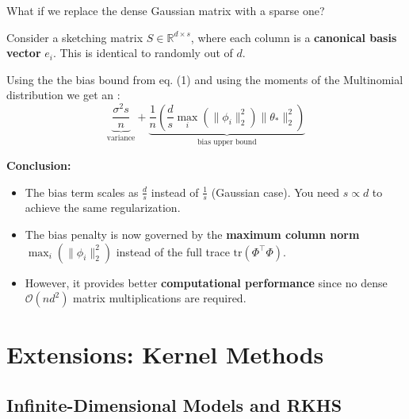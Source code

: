 \documentclass[
11pt,notheorems,hyperref={pdfauthor=whatever}
]{beamer}
\begin{document}
\begin{frame}
    What if we replace the dense Gaussian matrix with a sparse one? 

    Consider a sketching matrix \(S \in \mathbb{R}^{d \times s}\), where each column is a \alert{\textbf{canonical basis vector}} \(e_i\). This is identical to randomly  out of \(d\).

    Using the the bias bound from eq. (1) and using the moments of the Multinomial distribution we get an :
    \[
        \underbrace{\frac{\sigma^2 s}{n}}_{\text{variance}} + \underbrace{\frac{1}{n} \left( \frac{d}{s} \max_i(\|\phi_i\|_2^2) \|\theta_*\|_2^2 \right)}_{\text{bias upper bound}}
    \]

    \textbf{Conclusion:}
    \begin{itemize}
        \item The bias term scales as \(\frac{d}{s}\) instead of \(\frac{1}{s}\) (Gaussian case). You need \(s \propto d\) to achieve the same regularization.
        \item The bias penalty is now governed by the \alert{\textbf{maximum column norm}} \(\max_i(\|\phi_i\|_2^2)\) instead of the full trace \(\text{tr}(\Phi^\top\Phi)\).
        \item However, it provides better \alert{\textbf{computational performance}} since no dense \(\mathcal{O}(nd^2)\) matrix multiplications are required.
    \end{itemize}
\end{frame}


\section{Extensions: Kernel Methods}

\subsection{Infinite-Dimensional Models and RKHS}
\end{document}
